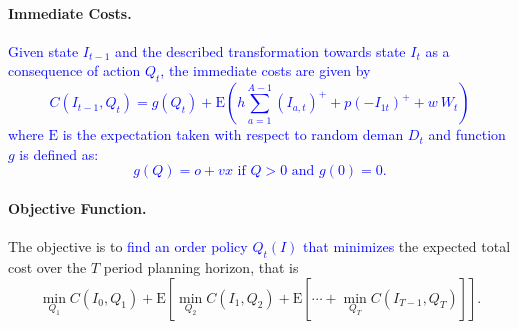 \documentclass{tPRS2e}
\newcommand{\blue}{\textcolor{blue}}
\begin{document}
	
	\paragraph*{\bf Immediate Costs.}
\blue{Given state $I_{t-1}$ and the described transformation  towards state $I_{t}$ as a consequence of action $Q_t$, the immediate costs are given by
	\begin{equation}
		\label{eq:imcosts}
			C(I_{t-1},Q_t) = g(Q_t)+ \mathrm E\left( h\sum_{a=1}^{A-1}(I_{a,t})^+ + p (-I_{1t})^+ + w ~ W_t \right)
			\end{equation}
%	
where $\mathrm E$ is the expectation taken with respect to random deman $D_t$ and function $g$ is defined as:
%	
	\begin{equation}
	g(Q)= o + v x \text{ if } Q>0 \text{ and } g(0)=0 .
	\end{equation}
	}
	\paragraph*{\bf Objective Function.}
The objective is to \blue{find an order policy $Q_t(I)$ that minimizes} the expected total cost over the $T$ period planning horizon, that is
%	
	\begin{equation}
		\label{eq:recursive}
		\min_{Q_1} C(I_{0},Q_1)+\mathrm E\left[\min_{Q_2} C(I_{1},Q_2)+ \mathrm E\left[\cdots+\min_{Q_T}  C(I_{T-1},Q_T)\right]\right].
	\end{equation}
	
	
	
\end{document}

